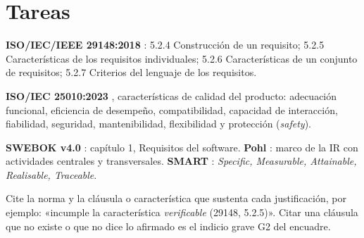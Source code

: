 \documentclass[11pt]{article}
\newcommand{\seccion}[1]{\section{\textcolor{utegreendk}{#1}}}
\begin{document}
\seccion{Tareas}

\begin{cajaclave}[title={Referencias que puede citar (sin consultar los documentos)}]
	\textbf{ISO/IEC/IEEE 29148:2018} \citep{iso29148_2018}: 5.2.4 Construcción de un requisito; 5.2.5 Características de los requisitos individuales; 5.2.6 Características de un conjunto de requisitos; 5.2.7 Criterios del lenguaje de los requisitos.\par
	\textbf{ISO/IEC 25010:2023} \citep{iso25010_2023}, características de calidad del producto: adecuación funcional, eficiencia de desempeño, compatibilidad, capacidad de interacción, fiabilidad, seguridad, mantenibilidad, flexibilidad y protección (\emph{safety}).\par
	\textbf{SWEBOK v4.0} \citep{swebok_v4_2024}: capítulo 1, Requisitos del software. \textbf{Pohl} \citep{pohl_2025}: marco de la IR con actividades centrales y transversales. \textbf{SMART} \citep{mannion_smart_1995}: \emph{Specific, Measurable, Attainable, Realisable, Traceable}.\par
	Cite la norma y la cláusula o característica que sustenta cada justificación, por ejemplo: «incumple la característica \emph{verificable} (29148, 5.2.5)». Citar una cláusula que no existe o que no dice lo afirmado es el indicio grave G2 del encuadre.
\end{cajaclave}
\end{document}

